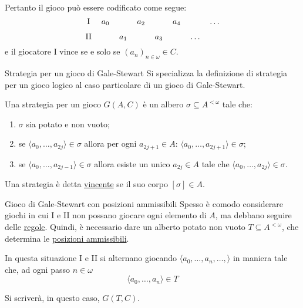 \documentclass[babel]{beamer}
\renewcommand{\href}[2]{#2}
\begin{document}
\begin{frame}[label={sec:org922f952}]
Pertanto il gioco può essere codificato come segue:
\begin{equation*}
\begin{tikzcd}[ampersand replacement=\&,cramped,sep=tiny]
	{\text{I}} \& {a_0} \&\& {a_2} \&\& {a_4} \&\& \dots \\
	{\text{II}} \&\& {a_1} \&\& {a_3} \&\& \dots
\end{tikzcd}
\end{equation*}
e il giocatore I vince se e solo se \((a_{n})_{n \in \omega} \in C\).
\end{frame}
\begin{frame}[label={sec:orge77dc7e}]{Strategia per un gioco di Gale-Stewart}
Si specializza la definizione di \href{../../../../../../../org/roam/20250513155732-logic_game.org}{strategia per un gioco logico} al caso particolare di un gioco di Gale-Stewart.

Una strategia per un gioco \(G(A,C)\) è un \href{../../../../../../../org/roam/20250514142154-albero_teoria_descrittiva_degli_insiemi.org}{albero} \(\sigma \subseteq A^{<\omega}\) tale che:
\begin{enumerate}
\item \(\sigma\) sia \href{../../../../../../../org/roam/20250514142208-albero_potato.org}{potato} e non vuoto;

\item se \(\langle a_{0},\dots,a_{2j}\rangle \in \sigma\) allora per ogni \(a_{2j+1} \in A\): \(\langle a_{0},\dots,a_{2j+1}\rangle \in \sigma\);

\item se \(\langle a_{0},\dots,a_{2j-1}\rangle \in \sigma\) allora esiste un unico \(a_{2j} \in A\) tale che \(\langle a_{0},\dots,a_{2j}\rangle \in \sigma\).
\end{enumerate}

Una strategia è detta \uline{vincente} se il suo \href{../../../../../../../org/roam/20250514142251-corpo_di_un_albero.org}{corpo} \([\sigma] \in A\).
\end{frame}
\begin{frame}[label={sec:orgcb9539c}]{Gioco di Gale-Stewart con posizioni ammissibili}
Spesso è comodo considerare giochi in cui I e II non possano giocare ogni elemento di \(A\), ma debbano seguire delle \uline{regole}. Quindi, è necessario dare un alberto potato non vuoto \(T \subseteq A^{<\omega}\), che determina le \href{../../../../../../../org/roam/20250514142938-posizioni_ammissibili_in_un_gioco_logico.org}{\uline{posizioni ammissibili}}.

In questa situazione I e II si alternano giocando \(\langle a_{0},\dots,a_{n},\dots,\rangle\) in maniera tale che, ad ogni passo \(n \in \omega\)
\begin{equation*}
\langle a_{0},\dots,a_{n}\rangle \in T
\end{equation*}

Si scriverà, in questo caso, \(G(T, C)\).
\end{frame}
\end{document}

